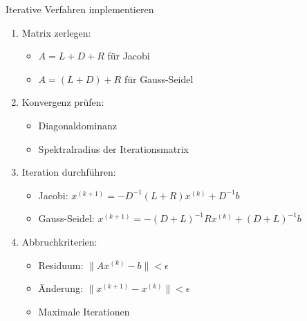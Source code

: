 \begin{KR}{Iterative Verfahren implementieren}
\begin{enumerate}
    \item Matrix zerlegen:
    \begin{itemize}
        \item $A = L + D + R$ für Jacobi
        \item $A = (L+D) + R$ für Gauss-Seidel
    \end{itemize}
    
    \item Konvergenz prüfen:
    \begin{itemize}
        \item Diagonaldominanz
        \item Spektralradius der Iterationsmatrix
    \end{itemize}
    
    \item Iteration durchführen:
    \begin{itemize}
        \item Jacobi: $x^{(k+1)} = -D^{-1}(L+R)x^{(k)} + D^{-1}b$
        \item Gauss-Seidel: $x^{(k+1)} = -(D+L)^{-1}Rx^{(k)} + (D+L)^{-1}b$
    \end{itemize}
    
    \item Abbruchkriterien:
    \begin{itemize}
        \item Residuum: $\|Ax^{(k)}-b\| < \epsilon$
        \item Änderung: $\|x^{(k+1)}-x^{(k)}\| < \epsilon$
        \item Maximale Iterationen
    \end{itemize}
\end{enumerate}
\end{KR}


